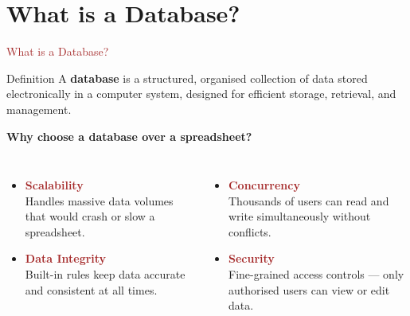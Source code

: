 

\section{What is a Database?}

\begin{frame}{\textcolor{brown}{What is a Database?}}
  \begin{block}{Definition}
    A \textbf{database} is a structured, organised collection of data stored electronically
    in a computer system, designed for efficient storage, retrieval, and management.
  \end{block}

  \vspace{0.5em}
  \textbf{Why choose a database over a spreadsheet?}
  \vspace{0.3em}

  \begin{columns}[T]
      \begin{itemize}
        \item[\faChartBar] \textcolor{brown}{\textbf{Scalability}} \\
          Handles massive data volumes that would crash or slow a spreadsheet.
        \vspace{0.4em}
        \item[\faCheckCircle] \textcolor{brown}{\textbf{Data Integrity}} \\
          Built-in rules keep data accurate and consistent at all times.
      \end{itemize}

      \begin{itemize}
        \item[\faUsers] \textcolor{brown}{\textbf{Concurrency}} \\
          Thousands of users can read and write simultaneously without conflicts.
        \vspace{0.4em}
        \item[\faLock] \textcolor{brown}{\textbf{Security}} \\
          Fine-grained access controls — only authorised users can view or edit data.
      \end{itemize}
  \end{columns}
\end{frame}